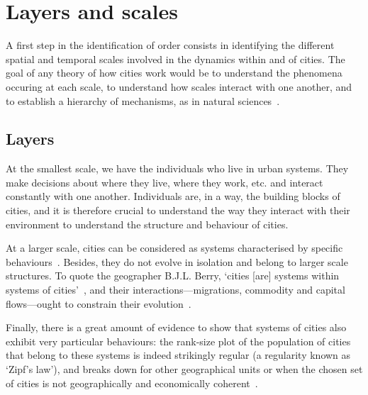 \section{Layers and scales}
\label{sub:layers_and_scales}

A first step in the identification of order consists in identifying the different
spatial and temporal scales involved in the dynamics within and of cities. The
goal of any theory of how cities work would be to understand the phenomena
occuring at each scale, to understand how scales interact with one another,
and to establish a hierarchy of
mechanisms, as in natural sciences~\cite{Simon:1962}.



\subsection{Layers}
\label{ssub:layers}

At the smallest scale, we have the individuals who live in urban
systems. They make decisions about where they live, where they work, etc. and
interact constantly with one another. Individuals are, in a way, the building
blocks of cities, and it is therefore crucial to understand the way they
interact with their environment to understand the structure and behaviour of
cities.

At a larger scale, cities can be considered as systems characterised by specific
behaviours~\cite{Bettencourt:2007}. Besides, they do not evolve in isolation and
belong to larger scale structures. To quote the geographer B.J.L. Berry, `cities
[are] systems within systems of cities'~\cite{Berry:1964}, and their
interactions---migrations, commodity and capital flows---ought to constrain
their evolution~\cite{Pumain:2010}. 

Finally, there is a great amount of evidence to show that systems of cities also
exhibit very particular behaviours: the rank-size plot of the population of
cities that belong to these systems is indeed strikingly regular (a regularity
known as `Zipf's law'), and breaks down for other geographical units or when the
chosen set of cities is not geographically and economically
coherent~\cite{Cristelli:2012}.\\


